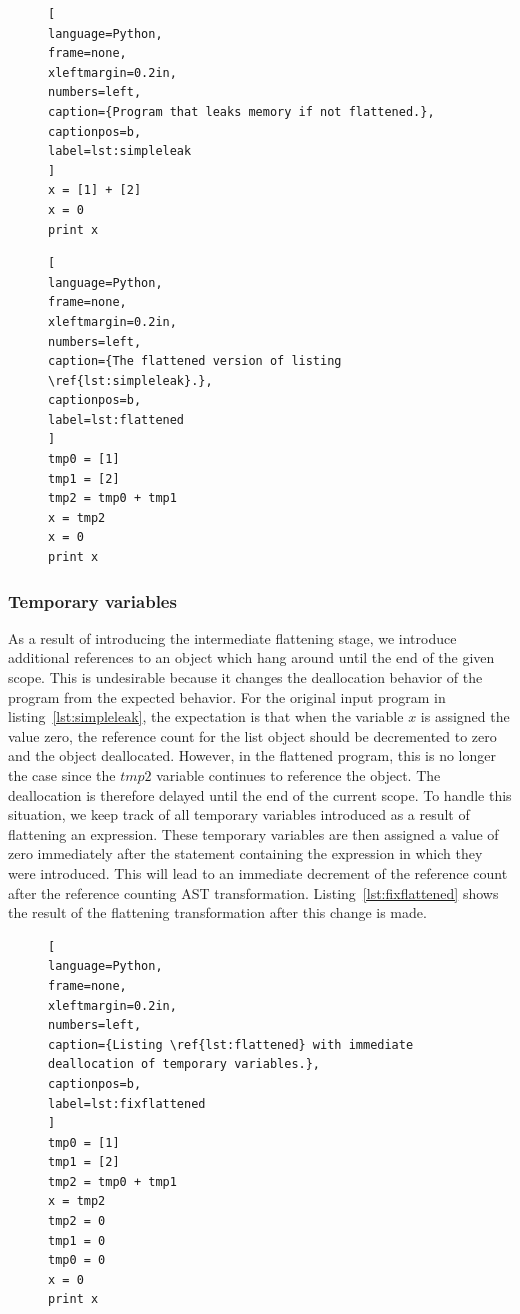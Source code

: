 \documentclass{sigplanconf}
\newcommand{\avariable}[1]{\ensuremath{#1}}
\begin{document}
\begin{figure}[h]
\begin{lstlisting}[
language=Python,
frame=none,
xleftmargin=0.2in,
numbers=left,
caption={Program that leaks memory if not flattened.},
captionpos=b,
label=lst:simpleleak
]
x = [1] + [2]
x = 0
print x
\end{lstlisting}
\end{figure}

\begin{figure}[h]
\begin{lstlisting}[
language=Python,
frame=none,
xleftmargin=0.2in,
numbers=left,
caption={The flattened version of listing \ref{lst:simpleleak}.},
captionpos=b,
label=lst:flattened
]
tmp0 = [1]
tmp1 = [2]
tmp2 = tmp0 + tmp1
x = tmp2
x = 0
print x
\end{lstlisting}
\end{figure}

\subsubsection{Temporary variables}
As a result of introducing the intermediate flattening stage, we introduce additional references to an object which hang around until the end of the given scope.  This is undesirable because it changes the deallocation behavior of the program from the expected behavior.  For the original input program in listing~\ref{lst:simpleleak}, the expectation is that when the variable \avariable{x} is assigned the value zero, the reference count for the list object should be decremented to zero and the object deallocated.  However, in the flattened program, this is no longer the case since the \avariable{tmp2} variable continues to reference the object.  The deallocation is therefore delayed until the end of the current scope.  To handle this situation, we keep track of all temporary variables introduced as a result of flattening an expression.  These temporary variables are then assigned a value of zero immediately after the statement containing the expression in which they were introduced.  This will lead to an immediate decrement of the reference count after the reference counting AST transformation.  Listing~\ref{lst:fixflattened} shows the result of the flattening transformation after this change is made.

\begin{figure}[h]
\begin{lstlisting}[
language=Python,
frame=none,
xleftmargin=0.2in,
numbers=left,
caption={Listing \ref{lst:flattened} with immediate deallocation of temporary variables.},
captionpos=b,
label=lst:fixflattened
]
tmp0 = [1]
tmp1 = [2]
tmp2 = tmp0 + tmp1
x = tmp2
tmp2 = 0
tmp1 = 0
tmp0 = 0
x = 0
print x
\end{lstlisting}
\end{figure}
\end{document}
